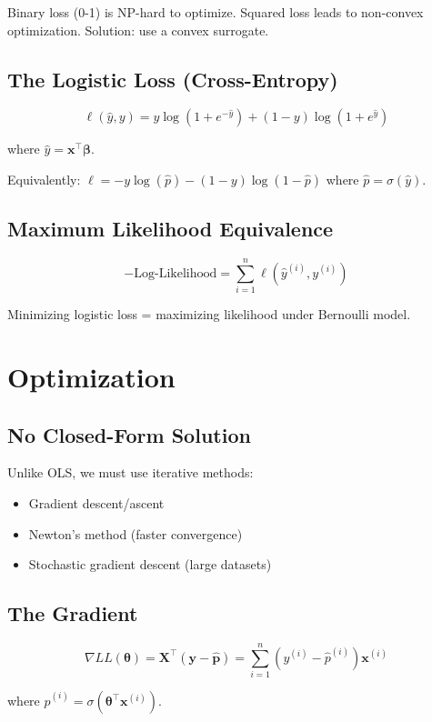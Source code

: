 \documentclass[main.tex]{subfiles}
\begin{document}
Binary loss (0-1) is NP-hard to optimize. Squared loss leads to non-convex optimization. Solution: use a convex surrogate.

\subsection{The Logistic Loss (Cross-Entropy)}

$$\boxed{\ell(\hat{y}, y) = y \log(1 + e^{-\hat{y}}) + (1-y) \log(1 + e^{\hat{y}})}$$

where $\hat{y} = \mathbf{x}^\top\boldsymbol{\beta}$.

Equivalently: $\ell = -y\log(\hat{p}) - (1-y)\log(1-\hat{p})$ where $\hat{p} = \sigma(\hat{y})$.

\subsection{Maximum Likelihood Equivalence}

$$\boxed{-\text{Log-Likelihood} = \sum_{i=1}^{n} \ell(\hat{y}^{(i)}, y^{(i)})}$$

Minimizing logistic loss = maximizing likelihood under Bernoulli model.

\section{Optimization}

\subsection{No Closed-Form Solution}

Unlike OLS, we must use iterative methods:
\begin{itemize}
    \item Gradient descent/ascent
    \item Newton's method (faster convergence)
    \item Stochastic gradient descent (large datasets)
\end{itemize}

\subsection{The Gradient}

$$\boxed{\nabla LL(\boldsymbol{\theta}) = \mathbf{X}^\top(\mathbf{y} - \hat{\mathbf{p}}) = \sum_{i=1}^{n} (y^{(i)} - \hat{p}^{(i)})\mathbf{x}^{(i)}}$$

where $\hat{p}^{(i)} = \sigma(\boldsymbol{\theta}^\top\mathbf{x}^{(i)})$.
\end{document}

